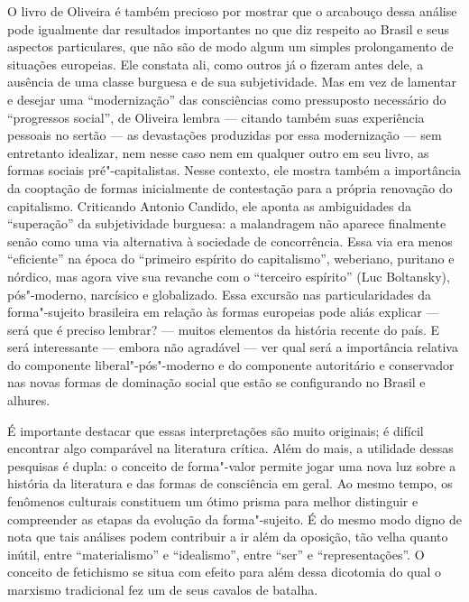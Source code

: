 O livro de Oliveira é também precioso por mostrar que o arcabouço dessa
análise pode igualmente dar resultados importantes no que diz respeito
ao Brasil e seus aspectos particulares, que não são de modo algum um
simples prolongamento de situações europeias. Ele constata ali, como
outros já o fizeram antes dele, a ausência de uma classe burguesa e de
sua subjetividade. Mas em vez de lamentar e desejar uma ``modernização''
das consciências como pressuposto necessário do ``progressos social'',
de Oliveira lembra --- citando também suas experiência pessoais no sertão
--- as devastações produzidas por essa modernização --- sem entretanto
idealizar, nem nesse caso nem em qualquer outro em seu livro, as formas
sociais pré"-capitalistas. Nesse contexto, ele mostra também a
importância da cooptação de formas inicialmente de contestação para a
própria renovação do capitalismo. Criticando Antonio Candido, ele aponta
as ambiguidades da ``superação'' da subjetividade burguesa: a
malandragem não aparece finalmente senão como uma via alternativa à
sociedade de concorrência. Essa via era menos ``eficiente'' na época do
``primeiro espírito do capitalismo'', weberiano, puritano e nórdico, mas
agora vive sua revanche com o ``terceiro espírito'' (Luc Boltansky),
pós"-moderno, narcísico e globalizado. Essa excursão nas particularidades
da forma"-sujeito brasileira em relação às formas europeias pode aliás
explicar --- será que é preciso lembrar? --- muitos elementos da história
recente do país. E será interessante --- embora não agradável --- ver qual
será a importância relativa do componente liberal"-pós"-moderno e do
componente autoritário e conservador nas novas formas de dominação
social que estão se configurando no Brasil e alhures.

É importante destacar que essas interpretações são muito originais; é
difícil encontrar algo comparável na literatura crítica. Além do mais, a
utilidade dessas pesquisas é dupla: o conceito de forma"-valor permite
jogar uma nova luz sobre a história da literatura e das formas de
consciência em geral. Ao mesmo tempo, os fenômenos culturais constituem
um ótimo prisma para melhor distinguir e compreender as etapas da
evolução da forma"-sujeito. É do mesmo modo digno de nota que tais
análises podem contribuir a ir além da oposição, tão velha quanto
inútil, entre ``materialismo'' e ``idealismo'', entre ``ser'' e
``representações''. O conceito de fetichismo se situa com efeito para
além dessa dicotomia do qual o marxismo tradicional fez um de seus
cavalos de batalha.

